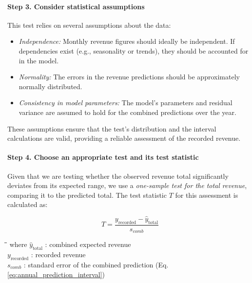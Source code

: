 \paragraph{Step 3. Consider statistical assumptions}
This test relies on several assumptions about the data:
\begin{itemize}
    \item \emph{Independence:} Monthly revenue figures should ideally be independent. If dependencies exist (e.g., seasonality or trends), they should be accounted for in the model.
    \item \emph{Normality:} The errors in the revenue predictions should be ap\-prox\-i\-mate\-ly normally distributed.
    \item \emph{Consistency in model parameters:} The model’s parameters and residual variance are assumed to hold for the combined predictions over the year.
\end{itemize}
These assumptions ensure that the test’s distribution and the interval calculations are valid, providing a reliable assessment of the recorded revenue.

\paragraph{Step 4. Choose an appropriate test and its test statistic}
Given that we are testing whether the observed revenue total significantly deviates from its expected range, we use a \emph{one-sample test for the total revenue}, comparing it to the predicted total. The test statistic $T$ for this assessment is calculated as:

\begin{equation}
\label{eq:test_statistic}
  T = \frac{y_{\text{recorded}} - \hat{y}_{\text{total}}}{s_{comb}}
\end{equation}

\begin{tabbing}
\hspace*{1.2cm}\=\hspace*{1.4cm}\=\hspace*{0.2cm}\= \kill
where \> $\hat{y}_{\text{total}}$ \> : \> combined expected revenue \\
      \> $y_{\text{recorded}}$     \> : \> recorded revenue \\
      \> $s_{comb}$     \> : \> standard error of the combined prediction (Eq. \ref{eq:annual_prediction_interval})
\end{tabbing}


